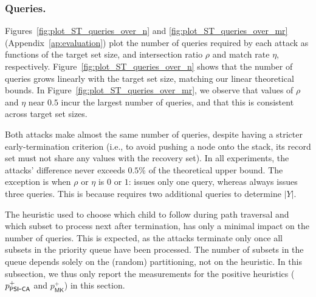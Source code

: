 \subsubsection{Queries.}\label{sec:st-queries}
Figures~\ref{fig:plot_ST_queries_over_n} and \ref{fig:plot_ST_queries_over_mr} (Appendix~\ref{ap:evaluation}) plot the number of queries required by each attack as functions of the target set size, and intersection ratio $\rho$ and match rate $\eta$, respectively.
Figure~\ref{fig:plot_ST_queries_over_n} shows that the number of queries grows linearly with the target set size, matching our linear theoretical bounds. In Figure~\ref{fig:plot_ST_queries_over_mr}, we observe that values of $\rho$ and $\eta$ near $0.5$ incur the largest number of queries, and that this is consistent across target set sizes.

Both attacks make almost the same number of queries, despite \mkpsiattack{} having a stricter early-termination criterion (i.e., to avoid pushing a node onto the stack, its record set must not share any values with the recovery set). In all experiments, the attacks' difference never exceeds $0.5\%$ of the theoretical upper bound. The exception is when $\rho$ or $\eta$ is $0$ or $1$: \mkpsiattack{} issues only one query, whereas \PSUCAattack{} always issues three queries. This is because \PSUCAattack{} requires two additional queries to determine $|Y|$.

The heuristic used to choose which child to follow during path traversal and which subset to process next after termination, has only a minimal impact on the number of queries. This is expected, as the attacks terminate only once all subsets in the priority queue have been processed. The number of subsets in the queue depends solely on the (random) partitioning, not on the heuristic. In this subsection, we thus only report the measurements for the positive heuristics ($p_{\mathsf{PSI\mbox{-}CA}}^{+}$ and $p_{\mathsf{MK}}^{+}$) in this section. 


